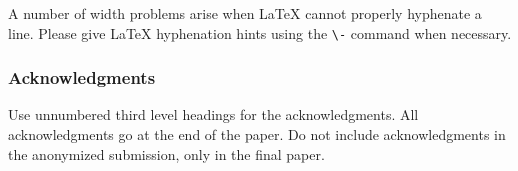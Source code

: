 \documentclass{article}
\begin{document}
A number of width problems arise when \LaTeX{} cannot properly hyphenate a
line. Please give LaTeX hyphenation hints using the \verb+\-+ command when
necessary.

\subsubsection*{Acknowledgments}

Use unnumbered third level headings for the acknowledgments. All acknowledgments
go at the end of the paper. Do not include acknowledgments in the anonymized
submission, only in the final paper.




\end{document}
